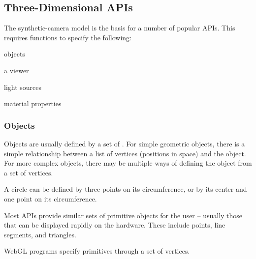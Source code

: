 \documentclass[\main/notes.tex]{subfiles}
\begin{document}
      \subsection{Three-Dimensional APIs}
        The synthetic-camera model is the basis for a number of popular APIs.
        This requires functions to specify the following:
        \begin{center}
          \begin{itemize*}[itemjoin=\quad]
            \item objects
            \item a viewer
            \item light sources
            \item material properties
          \end{itemize*}
        \end{center}

        \subsubsection{Objects}
          Objects are usually defined by a set of .
          For simple geometric objects, there is a simple relationship between a list of vertices
          (positions in space)
          and the object.
          For more complex objects, there may be multiple ways of defining the object
          from a set of vertices.

          \begin{example}[Circle]
            A circle can be defined by three points on its circumference,
            or by its center and one point on its circumference.
          \end{example}

          Most APIs provide similar sets of primitive objects for the user
          -- usually those that can be displayed rapidly on the hardware.
          These include points, line segments, and triangles.

          WebGL programs specify primitives through a set of vertices.
\end{document}
